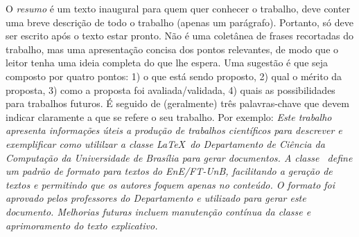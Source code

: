 O \emph{resumo} é um texto inaugural para quem quer conhecer o trabalho, deve conter
uma breve descrição de todo o trabalho (apenas um parágrafo). Portanto, só deve
ser escrito após o texto estar pronto. Não é uma coletânea de frases recortadas
do trabalho, mas uma apresentação concisa dos pontos relevantes, de modo que o
leitor tenha uma ideia completa do que lhe espera. Uma sugestão é que seja composto
por quatro pontos: 1) o que está sendo proposto, 2) qual o mérito da proposta, 3)
como a proposta foi avaliada/validada, 4) quais as possibilidades para trabalhos
futuros. É seguido de (geralmente) três palavras-chave que devem indicar claramente a que se
refere o seu trabalho. Por exemplo: \emph{Este trabalho apresenta informações úteis a produção de trabalhos
científicos para descrever e exemplificar como utililzar a classe \LaTeX\ do
Departamento de Ciência da Computação da Universidade de Brasília para gerar
documentos. A classe \unbene\ define um padrão de formato para textos do EnE/FT-UnB, facilitando a
geração de textos e permitindo que os autores foquem apenas no conteúdo. O formato
foi aprovado pelos professores do Departamento e utilizado para gerar este documento.
Melhorias futuras incluem manutenção contínua da classe e aprimoramento do texto
explicativo.}